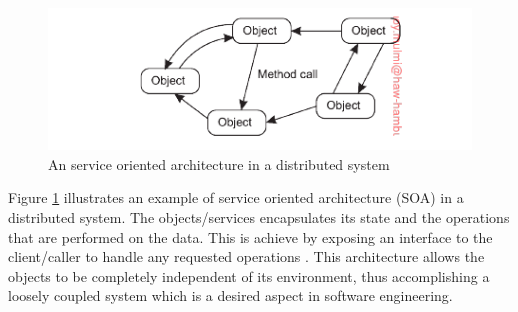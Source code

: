     \begin{figure}[htbp!]
        \centering \includegraphics[scale=0.94]{grafiken/objectBasedDS.png}
        \caption{An service oriented architecture in a distributed system 
            \cite[p.~62]{DistributedSystems}}
        \label{fig:objectBasedDS}
    \end{figure}

    \par
        Figure \ref{fig:objectBasedDS} illustrates an example of service oriented architecture 
        (SOA) in a distributed system. The objects/services encapsulates its state and 
        the operations that are performed on the data. This is achieve by exposing an 
        interface to the client/caller to handle any requested operations
        \cite{DistributedSystems}. This architecture allows the objects to be
        completely independent of its environment, thus accomplishing a loosely
        coupled system which is a desired aspect in software engineering.
        
        

        